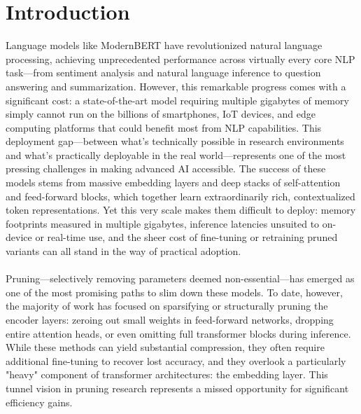 \documentclass[twocolumn]{article}
\begin{document}



\section{Introduction}

Language models like ModernBERT have revolutionized natural language processing, achieving unprecedented performance across virtually every core NLP task—from sentiment analysis and natural language inference to question answering and summarization. However, this remarkable progress comes with a significant cost: a state-of-the-art model requiring multiple gigabytes of memory simply cannot run on the billions of smartphones, IoT devices, and edge computing platforms that could benefit most from NLP capabilities. This deployment gap—between what's technically possible in research environments and what's practically deployable in the real world—represents one of the most pressing challenges in making advanced AI accessible. The success of these models stems from massive embedding layers and deep stacks of self-attention and feed-forward blocks, which together learn extraordinarily rich, contextualized token representations. Yet this very scale makes them difficult to deploy: memory footprints measured in multiple gigabytes, inference latencies unsuited to on-device or real-time use, and the sheer cost of fine-tuning or retraining pruned variants can all stand in the way of practical adoption.
\\ \\
Pruning—selectively removing parameters deemed non-essential—has emerged as one of the most promising paths to slim down these models. To date, however, the majority of work has focused on sparsifying or structurally pruning the encoder layers: zeroing out small weights in feed-forward networks, dropping entire attention heads, or even omitting full transformer blocks during inference. While these methods can yield substantial compression, they often require additional fine-tuning to recover lost accuracy, and they overlook a particularly "heavy" component of transformer architectures: the embedding layer. This tunnel vision in pruning research represents a missed opportunity for significant efficiency gains.
\end{document}
